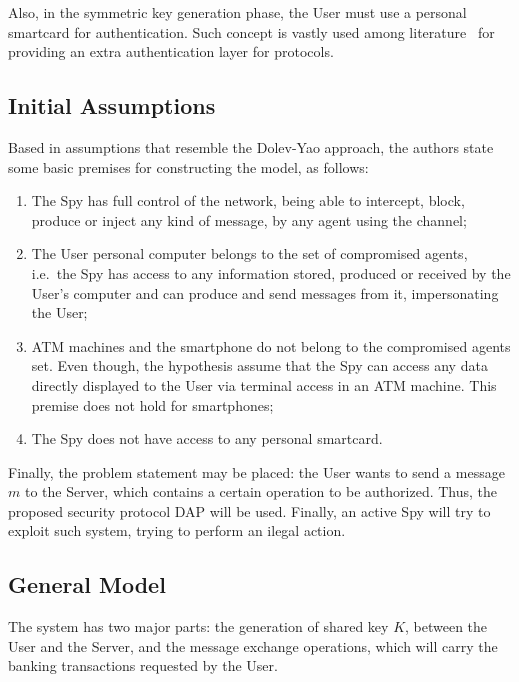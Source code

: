 Also, in the symmetric key generation phase, the User must use a personal smartcard for authentication. Such concept is vastly used among literature~\cite{ShoupRubin96} for providing an extra authentication layer for protocols.



\subsection{Initial Assumptions}
Based in assumptions that resemble the Dolev-Yao approach, the authors state some basic premises for constructing the model, as follows:

\begin{enumerate}
  \item The Spy has full control of the network, being able to intercept, block, produce or inject any kind of message, by any agent using the channel;

  \item The User personal computer belongs to the set of compromised agents, i.e.\ the Spy has access to any information stored, produced or received by the User's computer and can produce and send messages from it, impersonating the User;

  \item ATM machines and the smartphone do not belong to the compromised agents set. Even though, the hypothesis assume that the Spy can access any data directly displayed to the User via terminal access in an ATM machine. This premise does not hold for smartphones;

  \item The Spy does not have access to any personal smartcard.
\end{enumerate}

Finally, the problem statement may be placed: the User wants to send a message \(m\) to the Server, which contains a certain operation to be authorized. Thus, the proposed security protocol DAP will be used. Finally, an active Spy will try to exploit such system, trying to perform an ilegal action.



\subsection{General Model}
The system has two major parts: the generation of shared key \(K\), between the User and the Server, and the message exchange operations, which will carry the banking transactions requested by the User.

